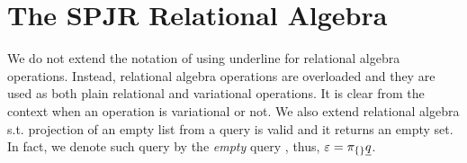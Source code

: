 \section{The SPJR Relational Algebra}
\label{sec:ra}


We do not extend the notation of using underline for relational algebra operations.
Instead, relational algebra operations are overloaded and they are used as
 both plain relational and variational operations. It is clear from the context when
 an operation is variational or not. 
We also extend relational algebra s.t. projection of an empty list from a query is valid
and it returns an empty set. In fact, we denote such query by the \emph{empty} query \empPRel, thus,
\ensuremath{
\empPRel = \pi_{\{\}} \pQ}.





